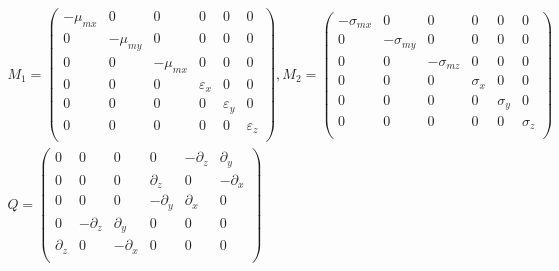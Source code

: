\documentclass[pdftex,a4paper,parskip,listof=totoc,bibliography=totoc,onehalfspacing,12pt]{scrreprt}
\begin{document}
\begin{equation}
\begin{aligned}
\begin{split}
& M_1 =
 \begin{pmatrix}
   -\mu_{mx}       & 0         & 0         & 0         & 0         & 0       \\
   0          & -\mu_{my}      & 0         & 0         & 0         & 0        \\
   0          & 0         & -\mu_{mx}      & 0         & 0         & 0        \\
   0          & 0         & 0         & \varepsilon_{x}      & 0         & 0        \\
   0          & 0         & 0         & 0         & \varepsilon_{y}      & 0        \\
   0          & 0         & 0         & 0         & 0         & \varepsilon_{z}     \\
 \end{pmatrix}, 
 M_2 =
 \begin{pmatrix}
   -\sigma_{mx}       & 0         & 0         & 0         & 0         & 0       \\
   0          & -\sigma_{my}      & 0         & 0         & 0         & 0        \\
   0          & 0         & -\sigma_{mz}      & 0         & 0         & 0        \\
   0          & 0         & 0         & \sigma_{x}      & 0         & 0        \\
   0          & 0         & 0         & 0         & \sigma_{y}      & 0        \\
   0          & 0         & 0         & 0         & 0         & \sigma_{z}     \\
 \end{pmatrix} \\
& Q = 
 \begin{pmatrix}
   0          & 0         & 0         & 0 	  	& -\partial_{z}	& \partial_{y}   \\
   0          & 0         & 0         & \partial_{z} 	& 0 	      	& -\partial_{x}  \\
   0          & 0         & 0         & -\partial_{y}	& \partial_{x} 	& 0	      \\
   0 	  	& -\partial_{z}	& \partial_{y}        & 0         & 0         & 0        \\
   \partial_{z} 	& 0 	      	& -\partial_{x}       & 0 	       & 0         & 0        \\

\end{pmatrix}
\end{split}
\end{aligned}
\end{equation}
\end{document}
